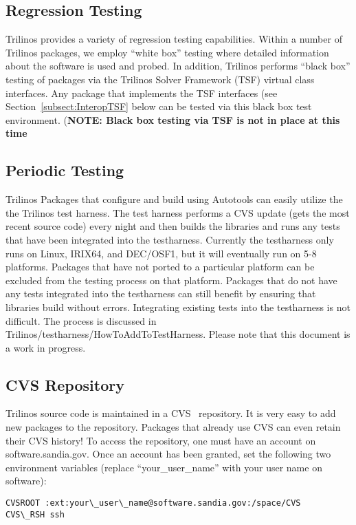 \documentclass[12pt,relax]{SANDreport}
\begin{document}
	\subsection{Regression Testing}
Trilinos provides a variety of regression
testing capabilities.  Within a number of Trilinos packages, we employ
``white box'' testing where detailed information about the software is
used and probed.  In addition, Trilinos performs ``black box'' testing
of packages via the Trilinos Solver Framework (TSF) virtual class
interfaces.  Any package that implements the TSF interfaces (see
Section~\ref{subsect:InteropTSF} below 
can be tested via this black box
test environment.  ({\bf NOTE: Black box testing via TSF is not in
place at this time}
	\subsection{Periodic Testing}
Trilinos Packages that configure and build using Autotools can easily 
utilize the the Trilinos test harness.  The test harness performs a CVS update
(gets the most recent source code) every night and then builds the libraries
and runs any tests that have been integrated into the testharness.  
Currently the testharness only runs on Linux, IRIX64, and DEC/OSF1, but it 
will eventually run on 5-8 platforms.  Packages that have not ported to a 
particular platform can be excluded from the testing process on that 
platform.  Packages that do not have any tests integrated into the 
testharness can still benefit by ensuring that libraries build without 
errors.  Integrating existing tests into the testharness is not difficult.  
The process is discussed in Trilinos/testharness/HowToAddToTestHarness.  
Please note that this document is a work in progress.

\subsection{CVS Repository}
Trilinos source code is maintained in a CVS~\cite{CVS} repository.  It is 
very easy to add new packages to the repository.  Packages that already use 
CVS can even retain their CVS history!  To access the repository, one must 
have an account on software.sandia.gov.  Once an account has been granted, 
set the following two environment variables (replace ``your\_user\_name'' 
with your user name on software):

\begin{verbatim}
CVSROOT :ext:your\_user\_name@software.sandia.gov:/space/CVS
CVS\_RSH ssh
\end{verbatim}
\end{document}
